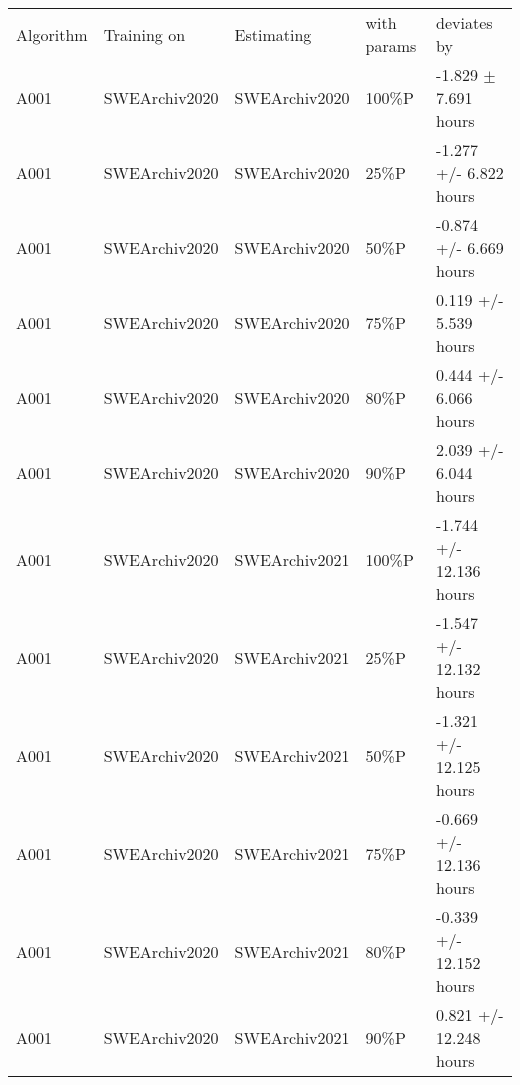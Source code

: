 \begin{tabular}{lllll}
\hline
 Algorithm & Training on   & Estimating    & with params & deviates by             \\
 A001      & SWEArchiv2020 & SWEArchiv2020 & 100\%P       & -1.829 $\pm$ 7.691 hours  \\
 A001      & SWEArchiv2020 & SWEArchiv2020 & 25\%P        & -1.277 +/- 6.822 hours  \\
 A001      & SWEArchiv2020 & SWEArchiv2020 & 50\%P        & -0.874 +/- 6.669 hours  \\
 A001      & SWEArchiv2020 & SWEArchiv2020 & 75\%P        & 0.119 +/- 5.539 hours   \\
 A001      & SWEArchiv2020 & SWEArchiv2020 & 80\%P        & 0.444 +/- 6.066 hours   \\
 A001      & SWEArchiv2020 & SWEArchiv2020 & 90\%P        & 2.039 +/- 6.044 hours   \\
 A001      & SWEArchiv2020 & SWEArchiv2021 & 100\%P       & -1.744 +/- 12.136 hours \\
 A001      & SWEArchiv2020 & SWEArchiv2021 & 25\%P        & -1.547 +/- 12.132 hours \\
 A001      & SWEArchiv2020 & SWEArchiv2021 & 50\%P        & -1.321 +/- 12.125 hours \\
 A001      & SWEArchiv2020 & SWEArchiv2021 & 75\%P        & -0.669 +/- 12.136 hours \\
 A001      & SWEArchiv2020 & SWEArchiv2021 & 80\%P        & -0.339 +/- 12.152 hours \\
 A001      & SWEArchiv2020 & SWEArchiv2021 & 90\%P        & 0.821 +/- 12.248 hours  \\
\hline
\end{tabular}
